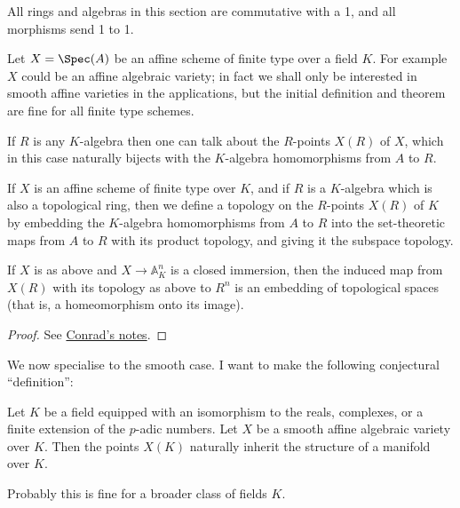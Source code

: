 All rings and algebras in this section are commutative with a 1, and all morphisms send 1 to 1.

Let $X=\Spec(A)$ be an affine scheme of finite type over a field $K$. For example $X$ could be an affine algebraic variety; in fact we shall only be interested in smooth affine varieties in the applications, but the initial definition and theorem are fine for all finite type schemes.

If $R$ is any $K$-algebra then one can talk about the $R$-points $X(R)$ of $X$, which in this case
naturally bijects with the $K$-algebra homomorphisms from $A$ to $R$.

\begin{definition}\label{topology_on_affine_variety_points} If $X$ is an affine scheme of finite
    type over $K$, and if $R$ is a $K$-algebra which is also a topological ring, then we define a topology on the $R$-points $X(R)$ of $K$ by embedding the $K$-algebra homomorphisms from $A$ to $R$ into the set-theoretic maps from $A$ to $R$ with its product topology, and giving it the subspace topology.
\end{definition}

\begin{theorem}\label{topology_on_affine_variety_computation}
    If $X$ is as above and $X\to\mathbb{A}^n_K$ is a closed immersion, then the induced map from $X(R)$ with its topology as above to $R^n$ is an embedding of topological spaces (that is, a homeomorphism onto its image).
\end{theorem}
\begin{proof} See \href{https://math.stanford.edu/~conrad/papers/adelictop.pdf}{Conrad's notes}.
\end{proof}

We now specialise to the smooth case. I want to make the following conjectural ``definition'':

\begin{definition}\label{manifold_on_algebraic_variety_points}\notready Let $K$ be a field equipped with an isomorphism to the reals, complexes, or a finite extension of the $p$-adic numbers. Let $X$ be a smooth affine algebraic variety over $K$. Then the points $X(K)$ naturally inherit the structure of a manifold over $K$.
\end{definition}

\begin{remark} Probably this is fine for a broader class of fields $K$.
\end{remark}

